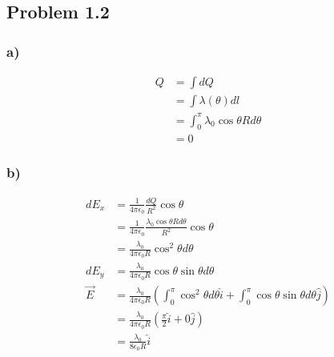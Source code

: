\documentclass[../homework.tex]{subfiles}
\begin{document}
\subsection{Problem 1.2}
\subsubsection*{a)}
\begin{align*}
    Q & = \int dQ                                         \\
      & = \int \lambda(\theta) dl                         \\
      & = \int_{0}^{\pi} \lambda_0 \cos{\theta} R d\theta \\
      & = 0
\end{align*}
\subsubsection*{b)}
\begin{align*}
    dE_x    & = \frac{1}{4 \pi \epsilon_0} \frac{dQ}{R^2} \cos{\theta}                               \\
            & = \frac{1}{4 \pi \epsilon_0} \frac{\lambda_0 \cos{\theta} R d\theta}{R^2} \cos{\theta} \\
            & = \frac{\lambda_0 }{4 \pi \epsilon_0 R} \cos^2{\theta} d\theta                         \\
    dE_y    & = \frac{\lambda_0 }{4 \pi \epsilon_0 R} \cos{\theta} \sin{\theta} d\theta              \\
    \vec{E} & = \frac{\lambda_0 }{4 \pi \epsilon_0 R} \left(
    \int_{0}^{\pi} \cos^2{\theta} d\theta \hat{i} + \int_{0}^{\pi} \cos{\theta}\sin{\theta} d\theta \hat{j}
    \right)                                                                                          \\
            & = \frac{\lambda_0 }{4 \pi \epsilon_0 R} \left(\frac{\pi}{2}\hat{i} + 0\hat{j}\right)   \\
            & = \frac{\lambda_0 }{8 \epsilon_0 R}\hat{i}                                             \\
\end{align*}
\end{document}
